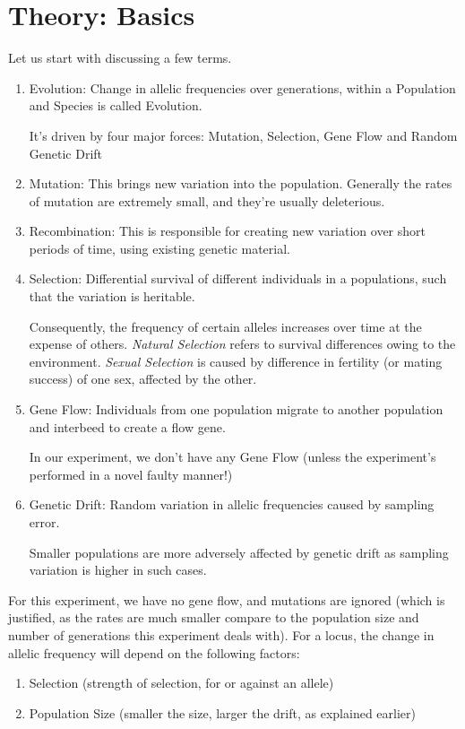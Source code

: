 \section{Theory: Basics}
	Let us start with discussing a few terms.
	\begin{enumerate}
		\item Evolution: Change in allelic frequencies over generations, within a Population and Species is called Evolution.
		\par
		It's driven by four major forces: Mutation, Selection, Gene Flow and Random Genetic Drift
		\item Mutation: This brings new variation into the population. Generally the rates of mutation are extremely small, and they're usually deleterious.
		\item Recombination: This is responsible for creating new variation over short periods of time, using existing genetic material.
		\item Selection: Differential survival of different individuals in a populations, such that the variation is heritable.
		\par
		Consequently, the frequency of certain alleles increases over time at the expense of others. \emph{Natural Selection} refers to survival differences owing to the environment. \emph{Sexual Selection} is caused by difference in fertility (or mating success) of one sex, affected by the other.
		\item Gene Flow: Individuals from one population migrate to another population and interbeed to create a flow gene.
		\par
		In our experiment, we don't have any Gene Flow (unless the experiment's performed in a novel faulty manner!)
		\item Genetic Drift: Random variation in allelic frequencies caused by sampling error.
		\par
		Smaller populations are more adversely affected by genetic drift as sampling variation is higher in such cases.
	\end{enumerate}
	For this experiment, we have no gene flow, and mutations are ignored (which is justified, as the rates are much smaller compare to the population size and number of generations this experiment deals with). For a locus, the change in allelic frequency will depend on the following factors:
	\begin{enumerate}
		\item Selection (strength of selection, for or against an allele)
		\item Population Size (smaller the size, larger the drift, as explained earlier)
	\end{enumerate}

